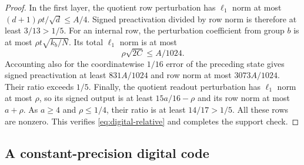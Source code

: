 \begin{proof}
In the first layer, the quotient row perturbation has $\ell_1$ norm at
most $(d+1)\rho t/\sqrt d\le A/4$.  Signed preactivation divided by row
norm is therefore at least $3/13>1/5$.
For an internal row, the perturbation coefficient from group $b$ is at
most $\rho t\sqrt{k_b/N}$.  Its total $\ell_1$ norm is at most
\[
 \rho\sqrt{2C}\le A/1024.
\]
Accounting also for the coordinatewise $1/16$ error of the preceding
state gives signed preactivation at least $831A/1024$ and row norm at
most $3073A/1024$.  Their ratio exceeds $1/5$.
Finally, the quotient readout perturbation has $\ell_1$ norm at most
$\rho$, so its signed output is at least $15a/16-\rho$ and its row norm
at most $a+\rho$.  As $a\ge4$ and $\rho\le1/4$, their ratio is at least
$14/17>1/5$.  All these rows are nonzero.  This verifies
\eqref{eq:digital-relative} and completes the support check.
\end{proof}

\subsection{A constant-precision digital code}

